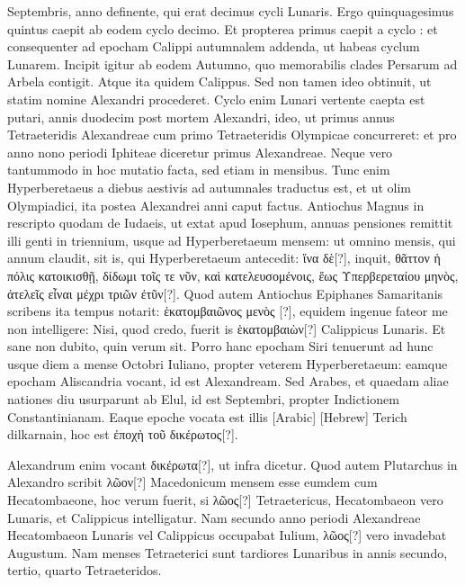  Septembris, anno  definente,
 qui erat decimus cycli Lunaris.
Ergo quinquagesimus quintus caepit ab eodem cyclo decimo.
Et propterea primus caepit a cyclo : et consequenter
  ad epocham
Calippi autumnalem addenda, ut habeas cyclum Lunarem.
Incipit igitur ab eodem Autumno, quo memorabilis clades Persarum
ad Arbela contigit.
Atque ita quidem Calippus.
Sed non tamen
ideo obtinuit, ut statim nomine Alexandri procederet.
Cyclo
enim Lunari vertente caepta est putari, annis duodecim post mortem
Alexandri, ideo, ut primus annus Tetraeteridis Alexandreae cum primo
Tetraeteridis Olympicae concurreret: et pro anno nono periodi
Iphiteae diceretur primus Alexandreae.
Neque vero tantummodo in
hoc mutatio facta, sed etiam in mensibus.
Tunc enim Hyperberetaeus
a diebus aestivis ad autumnales traductus est, et ut olim Olympiadici,
ita postea Alexandrei anni caput factus.
Antiochus Magnus in
rescripto quodam de Iudaeis, ut extat apud Iosephum, annuas pensiones
remittit illi genti in triennium, usque ad Hyperberetaeum mensem:
ut omnino mensis, qui annum claudit, sit is, qui Hyperberetaeum
antecedit: \textgreek{ἵνα δὲ[?]}, inquit,
 \textgreek{θᾶττον ἡ πόλις κατοικισθῇ, δίδωμι τοῖς τε
νῦν, καὶ κατελευσομένοις, ἕως Υπερβερεταίου μηνὸς,
 ἀτελεῖς εἶναι μέχρι τριῶν ἐτῦν[?]}.
Quod autem Antiochus Epiphanes Samaritanis scribens ita tempus
notarit: \textgreek{ἑκατομβαιῶνος μενὸς [?]},
 equidem ingenue fateor me non intelligere:
Nisi, quod credo, fuerit is \textgreek{ἑκατομβαιὼν[?]} Calippicus Lunaris.
%
Et sane non dubito, quin verum sit.
Porro hanc epocham Siri
tenuerunt ad hunc usque diem a mense Octobri Iuliano, propter veterem
Hyperberetaeum: eamque epocham Aliscandria vocant, id est
Alexandream.
Sed Arabes, et quaedam aliae nationes diu usurparunt
ab Elul, id est Septembri, propter Indictionem
Constantinianam.
Eaque epoche vocata
est illis \textarabic{[Arabic]} \texthebrew{[Hebrew]}
Terich dilkarnain, hoc est \textgreek{ἐποχὴ τοῦ δικέρωτος[?]}.
\begin{table}[htbp]
  
\end{table}
Alexandrum enim vocant \textgreek{δικέρωτα[?]}, ut infra
dicetur.
Quod autem Plutarchus in Alexandro
scribit \textgreek{λῶον[?]} Macedonicum mensem esse
eumdem cum Hecatombaeone, hoc verum
fuerit, si \textgreek{λῶος[?]} Tetraetericus, Hecatombaeon
vero Lunaris, et Calippicus intelligatur.
Nam
secundo anno periodi Alexandreae Hecatombaeon
Lunaris vel Calippicus occupabat Iulium, \textgreek{λῶος[?]} vero invadebat
Augustum.
Nam menses Tetraeterici sunt tardiores Lunaribus in
annis secundo, tertio, quarto Tetraeteridos.
